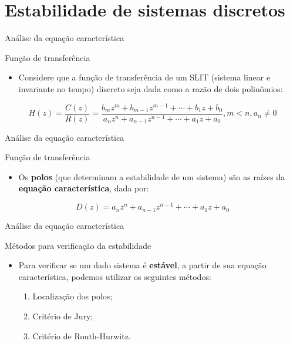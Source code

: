 \section{Estabilidade de sistemas discretos}

\begin{frame}{Análise da equação característica}
\begin{block}{Função de transferência}
\begin{itemize}
    \item Considere que a função de transferência de um SLIT (sistema linear e invariante no tempo) discreto seja dada como a razão de dois polinômios:
\end{itemize}
	$$H(z) = \dfrac{C(z)}{R(z)} = \dfrac{b_{m}z^{m}+b_{m-1}z^{m-1}+\cdots+b_{1}z+b_{0}}{a_{n}z^{n}+a_{n-1}z^{n-1}+\cdots+a_{1}z+a_{0}}, m < n, a_n \neq 0$$
\end{block}
\end{frame}

\begin{frame}{Análise da equação característica}
\begin{block}{Função de transferência}
\begin{itemize}
    \item Os \textbf{polos} (que determinam a estabilidade de um sistema) são as raízes da \textbf{equação característica}, dada por:
\end{itemize}
$$\boxed{D(z) = a_{n}z^{n}+a_{n-1}z^{n-1}+\cdots+a_{1}z+a_{0}}$$
\end{block}
\vspace{0.4cm}
\centering
\scalebox{0.8}{}
\end{frame}

\begin{frame}{Análise da equação característica}
\begin{block}{Métodos para verificação da estabilidade}
\begin{itemize}
    \item Para verificar se um dado sistema é \textbf{estável}, a partir de sua equação característica, podemos utilizar os seguintes métodos:
    \begin{enumerate}
        \item Localização dos polos;
        \item Critério de Jury;
        \item Critério de Routh-Hurwitz.
    \end{enumerate}
\end{itemize}
\end{block}
\end{frame}

